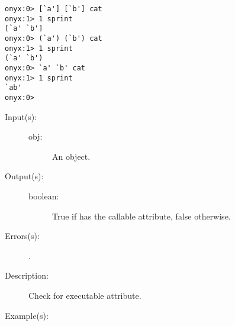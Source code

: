 \begin{description}
\begin{description}
\begin{verbatim}
onyx:0> [`a'] [`b'] cat
onyx:1> 1 sprint
[`a' `b']
onyx:0> (`a') (`b') cat
onyx:1> 1 sprint
(`a' `b')
onyx:0> `a' `b' cat
onyx:1> 1 sprint
`ab'
onyx:0>
		\end{verbatim}
	\end{description}
\label{systemdict:ccheck}
\item[{\onyxop{obj}{ccheck}{boolean}}: ]
	\begin{description}\item[]
	\item[Input(s): ]
		\begin{description}\item[]
		\item[obj: ]
			An object.
		\end{description}
	\item[Output(s): ]
		\begin{description}\item[]
		\item[boolean: ]
			True if  has the callable attribute, false
			otherwise.
		\end{description}
	\item[Errors(s): ]
		\begin{description}\item[]
		\item[.]
		\end{description}
	\item[Description: ]
		Check  for executable attribute.
	\item[Example(s): ]\begin{verbatim}


\end{verbatim}
\end{description}
\end{description}
